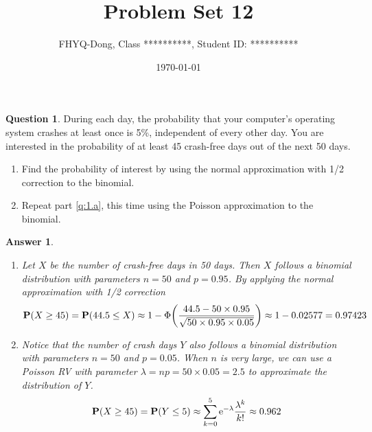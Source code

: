 \documentclass[utf8]{article}
\title{Problem Set 12}
\author{ FHYQ-Dong, Class **********, Student ID: ********** }
\date{\today}
\theoremstyle{definition}%
\newtheorem{question}{Question} %
\theoremstyle{plain}%
\newtheorem{answer}{Answer} %
\begin{document}
\maketitle
\thispagestyle{fancy}

\begin{question}
    During each day, the probability that your computer's operating system crashes at least once is 5\%, independent of every other day. You are interested in the probability of at least 45 crash-free days out of the next 50 days.
    \begin{enumerate}[label=(\alph*)]
        \item \label{q:1.a} Find the probability of interest by using the normal approximation with 1/2 correction to the binomial.
        \item Repeat part \ref{q:1.a}, this time using the Poisson approximation to the binomial.
    \end{enumerate}
\end{question}
\begin{answer} ~
    \begin{enumerate}[label=(\alph*)]
        \item Let $X$ be the number of crash-free days in 50 days. Then $X$ follows a binomial distribution with parameters $n = 50$ and $p = 0.95$. By applying the normal approximation with 1/2 correction
        \begin{equation}
            \mathbf{P}(X \geq 45) = \mathbf{P}(44.5 \leq X) \approx 1 - \Phi\qty(\frac{44.5 - 50 \times 0.95}{\sqrt{50 \times 0.95 \times 0.05}}) \approx 1 - 0.02577 = 0.97423
        \end{equation}
        \item Notice that the number of crash days $Y$ also follows a binomial distribution with parameters $n = 50$ and $p = 0.05$. When $n$ is very large, we can use a Poisson RV with parameter $\lambda = np = 50 \times 0.05 = 2.5$ to approximate the distribution of $Y$. 
        \begin{equation}
            \mathbf{P}(X \geq 45) = \mathbf{P}(Y \leq 5) \approx \sum_{k=0}^{5} \mathrm{e}^{-\lambda} \frac{\lambda^k}{k!} \approx 0.962
        \end{equation}
    \end{enumerate}
\end{answer}
\end{document}
